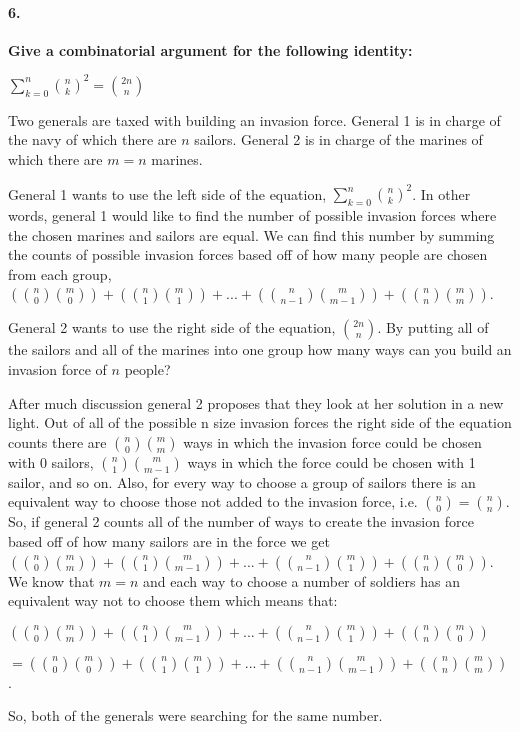 \documentclass{article}
\begin{document}
\pagebreak

\paragraph{6. }
\textbf{Give a combinatorial argument for the following identity:}
\begin{center}
$\sum\limits_{k=0}^n {n \choose k}^2 = {2n \choose n}$
\end{center}

Two generals are taxed with building an invasion force. General 1 is in charge 
of the navy of which there are $n$ sailors. General 2 is in charge of the 
marines of which there are ${m = n}$ marines. 

General 1 wants to use the left side of the equation, ${\sum\limits_{k=0}^n 
{n \choose k}^2}$. In other words, general 1 would like to find the number of 
possible invasion forces where the chosen marines and sailors are equal. We can 
find this number by summing the counts of possible invasion forces based off of 
how many people are chosen from each group, ${ ({n \choose 0} {m \choose 0}) + 
({n \choose 1} {m \choose 1}) + ... + ({n \choose n-1} {m \choose m-1}) + 
({n \choose n} {m \choose m})}$.

General 2 wants to use the right side of the equation, ${2n \choose n}$. By 
putting all of the sailors and all of the marines into one group how many ways 
can you build an invasion force of $n$ people?

After much discussion general 2 proposes that they look at her solution in a new 
light. Out of all of the possible n size invasion forces the right side of the 
equation counts there are ${ {n \choose 0} {m \choose m}}$ ways in which the 
invasion force could be chosen with 0 sailors, ${ {n \choose 1} 
{m \choose m-1}}$ ways in which the force could be chosen with 1 sailor, and so 
on. Also, for every way to choose a group of sailors there is an equivalent way 
to choose those not added to the invasion force, i.e. ${ {n \choose 0} = 
{n \choose n}}$. So, if general 2 counts all of the number of ways to create the 
invasion force based off of how many sailors are in the force we get 
${ ({n \choose 0} {m \choose m}) + ({n \choose 1} {m \choose m-1}) + ... + 
({n \choose n-1} {m \choose 1}) + ({n \choose n} {m \choose 0})}$. We know that 
${m = n}$ and each way to choose a number of soldiers has an equivalent way not 
to choose them which means that: 

${ ({n \choose 0} {m \choose m}) + ({n \choose 1} {m \choose m-1}) + ... + 
({n \choose n-1} {m \choose 1}) + ({n \choose n} {m \choose 0})}$ 

${= ({n \choose 0} {m \choose 0}) + ({n \choose 1} {m \choose 1}) + ... + 
({n \choose n-1} {m \choose m-1}) + ({n \choose n} {m \choose m})}$. 

So, both of the generals were searching for the same number.
\end{document}
